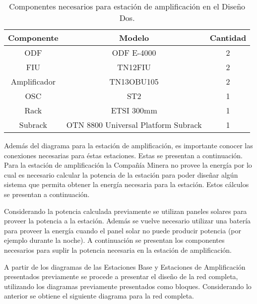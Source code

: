 \documentclass[letterpaper,11pt]{article} %
\begin{document}
\begin{table}[H]
\begin{tabular}{|c|c|c|}
\hline
\textbf{Componente} & \textbf{Modelo}     & \textbf{Cantidad} \\ \hline
ODF                 & ODF E-4000          & 2                 \\ \hline
FIU                 & TN12FIU             & 2                 \\ \hline
Amplificador        & TN13OBU105          & 2                 \\ \hline
OSC                 & ST2                 & 1                 \\ \hline
Rack                       &   ETSI 300mm              &   1                \\ \hline
Subrack                    &      OTN 8800 Universal Platform Subrack           & 1                  \\ \hline
\end{tabular}
\caption{Componentes necesarios para estación de amplificación en el Diseño Dos.}
\end{table}
\newp
Además del diagrama para la estación de amplificación, es importante conocer las conexiones necesarias para éstas estaciones. Estas se presentan a continuación.
\newp
\newp
Para la estación de amplificación la Compañía Minera no provee la energía por lo cual es necesario calcular la potencia de la estación para poder diseñar algún sistema que permita obtener la energía necesaria para la estación. Estos cálculos se presentan a continuación.



\newp
Considerando la potencia calculada previamente se utilizan paneles solares para proveer la potencia a la estación. Además se vuelve necesario utilizar una batería para proveer la energía cuando el panel solar no puede producir potencia (por ejemplo durante la noche). A continuación se presentan los componentes necesarios para suplir la potencia necesaria en la estación de amplificación.



\newp
A partir de los diagramas de las Estaciones Base y Estaciones de Amplificación presentados previamente se procede a presentar el diseño de la red completa, utilizando los diagramas previamente presentados como bloques. Considerando lo anterior se obtiene el siguiente diagrama para la red completa. 
\end{document}
